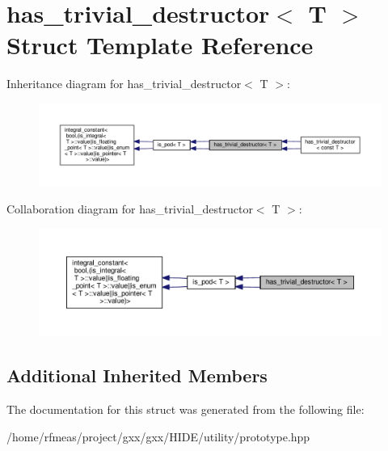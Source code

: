 \hypertarget{structhas__trivial__destructor}{}\section{has\+\_\+trivial\+\_\+destructor$<$ T $>$ Struct Template Reference}
\label{structhas__trivial__destructor}


Inheritance diagram for has\+\_\+trivial\+\_\+destructor$<$ T $>$\+:
\nopagebreak
\begin{figure}[H]
\begin{center}
\leavevmode
\includegraphics[width=350pt]{structhas__trivial__destructor__inherit__graph}
\end{center}
\end{figure}


Collaboration diagram for has\+\_\+trivial\+\_\+destructor$<$ T $>$\+:
\nopagebreak
\begin{figure}[H]
\begin{center}
\leavevmode
\includegraphics[width=350pt]{structhas__trivial__destructor__coll__graph}
\end{center}
\end{figure}
\subsection*{Additional Inherited Members}


The documentation for this struct was generated from the following file\+:\begin{DoxyCompactItemize}
\item 
/home/rfmeas/project/gxx/gxx/\+H\+I\+D\+E/utility/prototype.\+hpp\end{DoxyCompactItemize}
